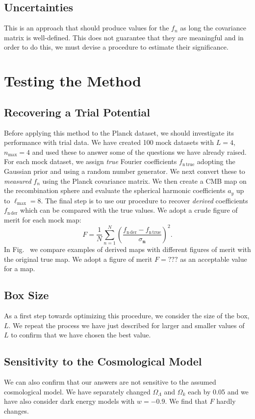 \documentclass[useAMS,usenatbib,a4paper]{mn2e}
\begin{document}
\subsection{Uncertainties}
This is an approach that should produce values for the $f_n$ as long the covariance matrix is well-defined. This does not guarantee that they are meaningful and in order to do this, we must devise a procedure to estimate their significance.
\section{Testing the Method}
\subsection{Recovering a Trial Potential}
Before applying this method to the Planck dataset, we should investigate its performance with trial data. We have created 100 mock datasets with $L=4$, $n_\mathrm{max}=4$ and used these to answer some of the questions we have already raised. For each mock dataset, we assign {\it true} Fourier coefficients $f_\mathrm{n\,true}$ adopting the Gaussian prior and using a random number generator. We next convert these to {\it measured} $f_n$ using the Planck covariance matrix. We then create a CMB map on the recombination sphere and evaluate the spherical harmonic coefficients $a_y$ up to $\ell_\mathrm{max}=8$. The final step is to use our procedure to recover {\it derived} coefficients $f_\mathrm{n\,der}$ which can be compared with the true values. We adopt a crude  figure of merit for each mock map:
\begin{equation}
F=\frac1N\sum_{n=1}^N\left(\frac{f_\mathrm{n\,der}-f_\mathrm{n\,true}}{\sigma_{\mathbf n}}\right)^2.
\end{equation}
In Fig.~ we compare examples of derived maps with different figures of merit with the original true map. We adopt a figure of merit $F=???$ as an acceptable value for a map.
\subsection{Box Size}
As a first step towards optimizing this procedure, we consider the size of the box, $L$. We repeat the process we have just described for larger and smaller values of $L$ to confirm that we have chosen the best value. 
\subsection{Sensitivity to the Cosmological Model}
We can also confirm that our answers are not sensitive to the assumed cosmological model. We have separately changed $\Omega_\Lambda$ and $\Omega_k$ each by  0.05 and we have also consider dark energy models with $w=-0.9$. We find that $F$ hardly changes.
\end{document}
